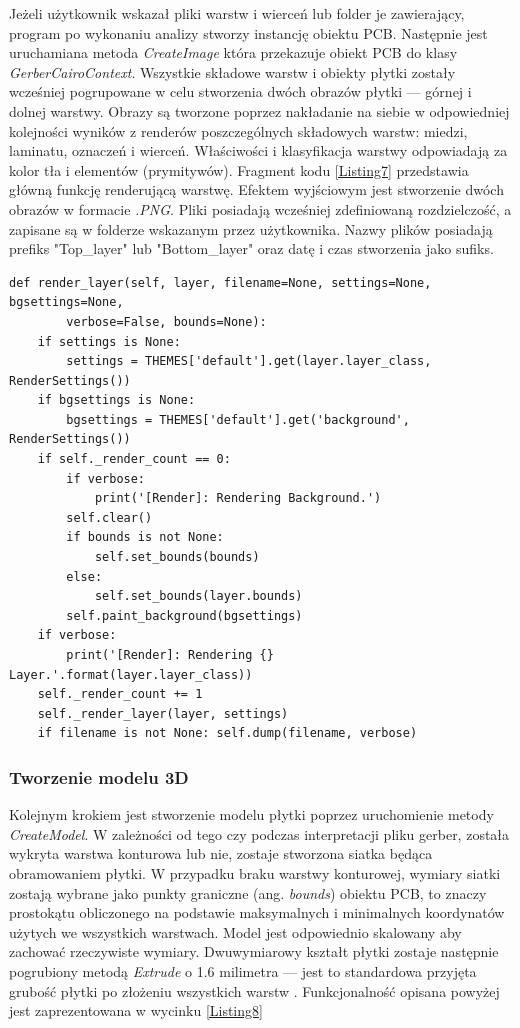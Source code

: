 \documentclass{xmgr}
\begin{document}
Jeżeli użytkownik wskazał pliki warstw i wierceń lub folder je zawierający, program po wykonaniu analizy stworzy instancję obiektu PCB. Następnie jest uruchamiana metoda \emph{CreateImage} która przekazuje obiekt PCB do klasy \emph{GerberCairoContext}. Wszystkie składowe warstw i obiekty płytki zostały wcześniej pogrupowane w celu stworzenia dwóch obrazów płytki --- górnej i dolnej warstwy. Obrazy są tworzone poprzez nakładanie na siebie w odpowiedniej kolejności wyników z renderów poszczególnych składowych warstw: miedzi, laminatu, oznaczeń i wierceń. Właściwości i klasyfikacja warstwy odpowiadają za kolor tła i elementów (prymitywów). Fragment kodu \ref{Listing7} przedstawia główną funkcję renderującą warstwę.
Efektem wyjściowym jest stworzenie dwóch obrazów w formacie \emph{.PNG}. Pliki posiadają wcześniej zdefiniowaną rozdzielczość, a zapisane są w folderze wskazanym przez użytkownika. Nazwy plików posiadają prefiks "Top\_layer" lub "Bottom\_layer" oraz datę i czas stworzenia jako sufiks. 

\begin{lstlisting}
def render_layer(self, layer, filename=None, settings=None, bgsettings=None,
		verbose=False, bounds=None):
    if settings is None:
        settings = THEMES['default'].get(layer.layer_class, RenderSettings())
    if bgsettings is None:
        bgsettings = THEMES['default'].get('background', RenderSettings())
    if self._render_count == 0:
        if verbose:
            print('[Render]: Rendering Background.')
        self.clear()
        if bounds is not None:
            self.set_bounds(bounds)
        else:
            self.set_bounds(layer.bounds)
        self.paint_background(bgsettings)
    if verbose:
        print('[Render]: Rendering {} Layer.'.format(layer.layer_class))
    self._render_count += 1
    self._render_layer(layer, settings)
    if filename is not None: self.dump(filename, verbose)
\end{lstlisting}

\subsubsection{Tworzenie modelu 3D}
Kolejnym krokiem jest stworzenie modelu płytki poprzez uruchomienie metody \emph{CreateModel}. W zależności od tego czy podczas interpretacji pliku gerber, została wykryta warstwa konturowa lub nie, zostaje stworzona siatka będąca obramowaniem płytki. W przypadku braku warstwy konturowej, wymiary siatki zostają wybrane jako punkty graniczne (ang. \emph{bounds}) obiektu PCB, to znaczy prostokątu obliczonego na podstawie maksymalnych i minimalnych koordynatów użytych we wszystkich warstwach. Model jest odpowiednio skalowany aby zachować rzeczywiste wymiary. Dwuwymiarowy kształt płytki zostaje następnie pogrubiony metodą \emph{Extrude} o 1.6 milimetra --- jest to standardowa przyjęta grubość płytki po złożeniu wszystkich warstw \cite{Khandpur}. Funkcjonalność opisana powyżej jest zaprezentowana w wycinku \ref{Listing8}
\end{document}

